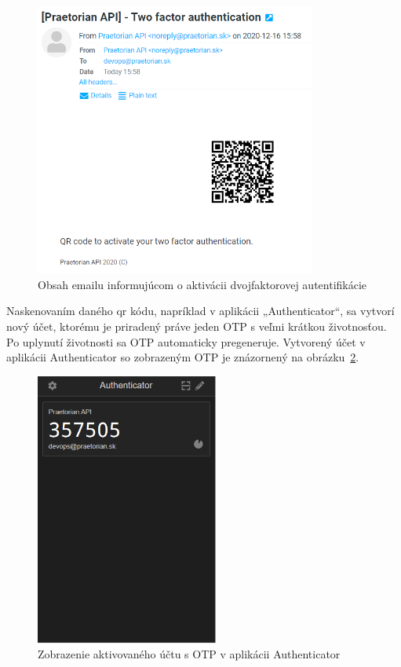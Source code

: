 \begin{figure}[H]
\begin{center}\includegraphics[width=\textwidth,height=9cm,keepaspectratio=true]{assets/2fa_email.png}\end{center}
\caption[Obsah emailu informujúcom o aktivácii dvojfaktorovej autentifikácie]{Obsah emailu informujúcom o aktivácii dvojfaktorovej autentifikácie}\label{fig:obr_14}
\end{figure}

Naskenovaním daného qr kódu, napríklad v aplikácii „Authenticator“, sa vytvorí nový účet, ktorému je priradený práve jeden OTP
s veľmi krátkou životnosťou.
Po uplynutí životnosti sa OTP automaticky pregeneruje.
Vytvorený účet v aplikácii Authenticator so zobrazeným OTP je znázornený na obrázku~\ref{fig:obr_15}.

\begin{figure}[H]
\begin{center}\includegraphics[width=\textwidth,height=9cm,keepaspectratio=true]{assets/authenticator.png}\end{center}
\caption[Zobrazenie aktivovaného účtu s OTP v aplikácii Authenticator]{Zobrazenie aktivovaného účtu s OTP v aplikácii Authenticator}\label{fig:obr_15}
\end{figure}


